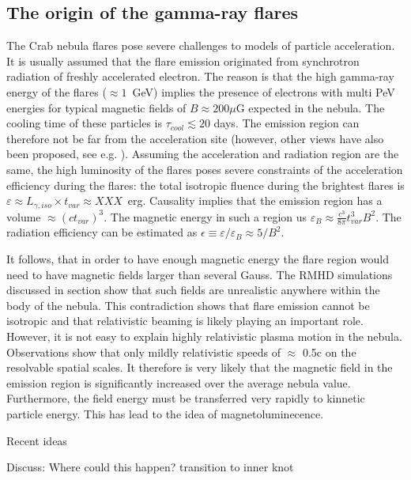 \subsection{The origin of the gamma-ray flares}

The Crab nebula flares pose severe challenges to models of particle acceleration. It is usually assumed that the flare emission originated from synchrotron radiation of freshly accelerated electron. The reason is that the high gamma-ray energy of the flares ($\approx 1$~GeV) implies the presence of electrons with multi PeV energies for typical magnetic fields of $B \approx 200 \mu$G expected in the nebula. The cooling time of these particles is $\tau_{cool} \lesssim 20$ days. The emission region can therefore not be far from the acceleration site (however, other views have also been proposed, see e.g. \cite{Bykov_2012}). Assuming the acceleration and radiation region are the same, the high luminosity of the flares poses severe constraints of the acceleration efficiency during the flares: the total isotropic fluence during the brightest flares is $\varepsilon \approx L_{\gamma,iso} \times t_{var} \approx XXX $~erg. Causality implies that the emission region has a volume $\approx (c t_{var})^3$. The magnetic energy in such a region us $\varepsilon_B \approx \frac{c^3}{8 \pi} t_{var}^3 B^2$. The radiation efficiency can be estimated as $\epsilon \equiv \varepsilon / \varepsilon_B \approx  5 / B^2$. 

It follows, that in order to have enough magnetic energy the flare region would need to have magnetic fields larger than several Gauss. The RMHD simulations discussed in section show that such fields are unrealistic anywhere within the body of the nebula.  This contradiction shows that flare emission cannot be isotropic and that relativistic beaming is likely playing an important role. However, it is not easy to explain highly relativistic plasma motion in the nebula. Observations show that only mildly relativistic speeds of $\approx$ 0.5c on the resolvable spatial scales. It therefore is very likely that the magnetic field in the emission region is significantly increased over the average nebula value. Furthermore, the field energy must be transferred very rapidly to kinnetic particle energy. This has lead to the idea of magnetoluminecence.


Recent ideas  \cite{Cerutti_2014}\cite{2016arXiv160403179Y}\cite{2015arXiv151205426Z}\cite{2016arXiv160304850N}\cite{2016arXiv160305731L}

Discuss: Where could this happen? transition to inner knot